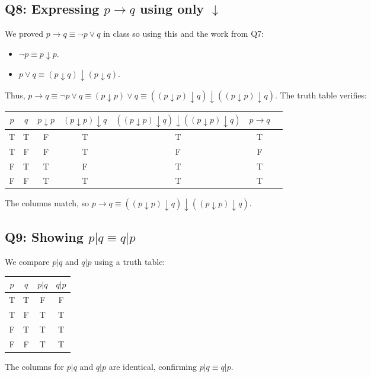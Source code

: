 \documentclass[12pt]{article}
\begin{document}
\subsection*{Q8: Expressing $p \to q$ using only $\downarrow$}
We proved $p \to q \equiv \neg p \vee q$ in class so using this and the work from Q7:
\begin{itemize}
    \item $\neg p \equiv p \downarrow p$.
    \item $p \vee q \equiv (p \downarrow q) \downarrow (p \downarrow q)$.
\end{itemize}
Thus, $p \to q \equiv \neg p \vee q \equiv (p \downarrow p) \vee q \equiv ((p \downarrow p) \downarrow q) \downarrow ((p \downarrow p) \downarrow q)$. The truth table verifies:

\begin{center}
\begin{tabular}{cc|ccccc}
\toprule
$p$ & $q$ & $p \downarrow p$ & $(p \downarrow p) \downarrow q$ & $((p \downarrow p) \downarrow q) \downarrow ((p \downarrow p) \downarrow q)$ & $p \to q$ \\
\midrule
T & T & F & T & T & T \\
T & F & F & T & F & F \\
F & T & T & F & T & T \\
F & F & T & T & T & T \\
\bottomrule
\end{tabular}
\end{center}

The columns match, so $p \to q \equiv ((p \downarrow p) \downarrow q) \downarrow ((p \downarrow p) \downarrow q)$.

\subsection*{Q9: Showing $p | q \equiv q | p$}
We compare $p | q$ and $q | p$ using a truth table:

\begin{center}
\begin{tabular}{cc|cc}
\toprule
$p$ & $q$ & $p | q$ & $q | p$ \\
\midrule
T & T & F & F \\
T & F & T & T \\
F & T & T & T \\
F & F & T & T \\
\bottomrule
\end{tabular}
\end{center}

The columns for $p | q$ and $q | p$ are identical, confirming $p | q \equiv q | p$.
\end{document}
